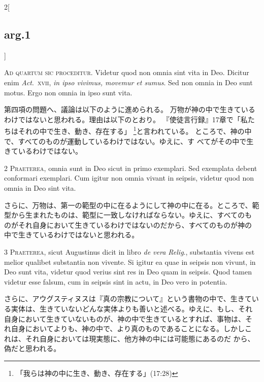 \documentclass[paper=a4paper,fontsize=10pt,jafontsize=9pt,titlepage]{jlreq}
\begin{document}
\begin{paracol}{2}[\subsection{arg.1}]


{\huge A}{\scshape d quartum sic proceditur}. Videtur quod non
 omnia sint vita in Deo. Dicitur enim {\itshape Act}.~{\scshape xvii}, {\itshape in ipso vivimus,
 movemur et sumus}. Sed non omnia in Deo sunt motus. Ergo non omnia in
 ipso sunt vita.

\switchcolumn

第四項の問題へ、議論は以下のように進められる。
万物が神の中で生きているわけではないと思われる。理由は以下のとおり。
『使徒言行録』17章で「私たちはそれの中で生き、動き、存在する」
 \footnote{「我らは神の中に生き、動き、存在する」(17:28)}と言われている。
 ところで、神の中で、すべてのものが運動しているわけではない。ゆえに、す
 べてがその中で生きているわけではない。



{\scshape 2 Praeterea}, omnia sunt in Deo sicut in primo
 exemplari. Sed exemplata debent conformari exemplari. Cum igitur non
 omnia vivant in seipsis, videtur quod non omnia in Deo sint vita.

\switchcolumn

さらに、万物は、第一の範型の中に在るようにして神の中に在る。ところで、範
 型から生まれたものは、範型に一致しなければならない。ゆえに、すべてのも
 のがそれ自身において生きているわけではないのだから、すべてのものが神の
 中で生きているわけではないと思われる。



{\scshape 3 Praeterea}, sicut Augustinus dicit in libro
 {\itshape de vera Relig}., substantia vivens est melior qualibet substantia non
 vivente. Si igitur ea quae in seipsis non vivunt, in Deo sunt vita,
 videtur quod verius sint res in Deo quam in seipsis. Quod tamen videtur
 esse falsum, cum in seipsis sint in actu, in Deo vero in potentia.

\switchcolumn

さらに、アウグスティヌスは『真の宗教について』という書物の中で、生きてい
 る実体は、生きていないどんな実体よりも善いと述べる。ゆえに、もし、それ
 自身において生きていないものが、神の中で生きているとすれば、事物は、そ
 れ自身においてよりも、神の中で、より真のものであることになる。しかしこ
 れは、それ自身においては現実態に、他方神の中には可能態にあるのだ
 から、偽だと思われる。


\end{paracol}
\end{document}
